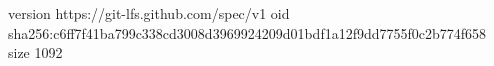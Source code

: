 version https://git-lfs.github.com/spec/v1
oid sha256:c6ff7f41ba799c338cd3008d3969924209d01bdf1a12f9dd7755f0c2b774f658
size 1092
